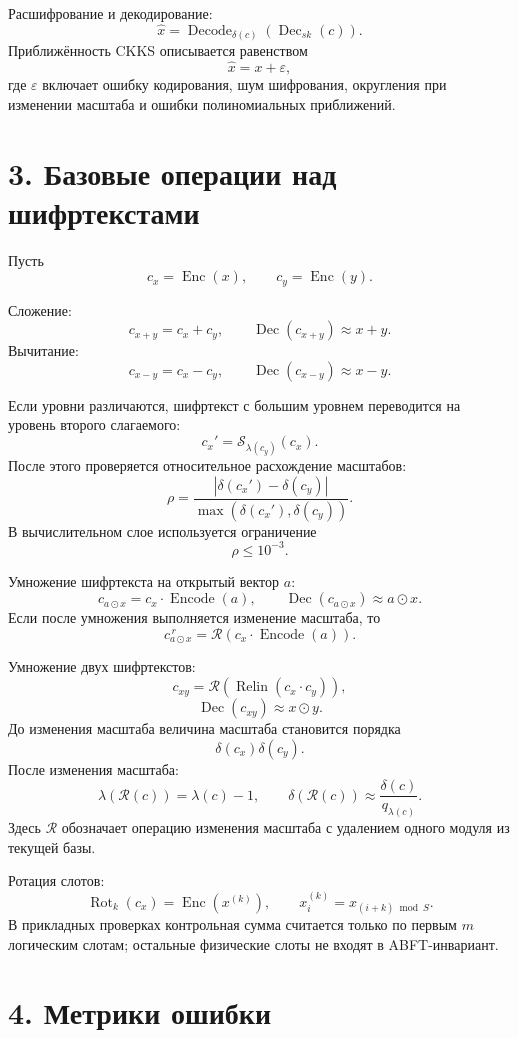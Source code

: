 \documentclass[12pt]{article}
\newcommand{\Enc}{\operatorname{Enc}}
\newcommand{\Dec}{\operatorname{Dec}}
\newcommand{\Encode}{\operatorname{Encode}}
\newcommand{\Decode}{\operatorname{Decode}}
\newcommand{\Resc}{\mathcal{R}}
\newcommand{\Relin}{\operatorname{Relin}}
\newcommand{\Rot}{\operatorname{Rot}}
\newcommand{\Switch}{\mathcal{S}}
\newcommand{\lvl}{\lambda}
\newcommand{\scl}{\delta}
\begin{document}
Расшифрование и декодирование:
\[
    \hat{x}=
    \Decode_{\scl(c)}
    \left(
        \Dec_{sk}(c)
    \right).
\]
Приближённость CKKS описывается равенством
\[
    \hat{x}=x+\varepsilon,
\]
где \(\varepsilon\) включает ошибку кодирования, шум шифрования, округления
при изменении масштаба и ошибки полиномиальных приближений.

\section*{3. Базовые операции над шифртекстами}

Пусть
\[
    c_x=\Enc(x),\qquad c_y=\Enc(y).
\]

Сложение:
\[
    c_{x+y}=c_x+c_y,
    \qquad
    \Dec(c_{x+y})\approx x+y.
\]
Вычитание:
\[
    c_{x-y}=c_x-c_y,
    \qquad
    \Dec(c_{x-y})\approx x-y.
\]

Если уровни различаются, шифртекст с большим уровнем переводится на уровень
второго слагаемого:
\[
    c_x'=\Switch_{\lvl(c_y)}(c_x).
\]
После этого проверяется относительное расхождение масштабов:
\[
    \rho=
    \frac{|\scl(c_x')-\scl(c_y)|}
    {\max(\scl(c_x'),\scl(c_y))}.
\]
В вычислительном слое используется ограничение
\[
    \rho\leq 10^{-3}.
\]

Умножение шифртекста на открытый вектор \(a\):
\[
    c_{a\odot x}=c_x\cdot\Encode(a),
    \qquad
    \Dec(c_{a\odot x})\approx a\odot x.
\]
Если после умножения выполняется изменение масштаба, то
\[
    c_{a\odot x}^{\,r}
    =
    \Resc(c_x\cdot\Encode(a)).
\]

Умножение двух шифртекстов:
\[
    c_{xy}
    =
    \Resc
    \left(
        \Relin(c_x\cdot c_y)
    \right),
\]
\[
    \Dec(c_{xy})\approx x\odot y.
\]
До изменения масштаба величина масштаба становится порядка
\[
    \scl(c_x)\scl(c_y).
\]
После изменения масштаба:
\[
    \lvl(\Resc(c))=\lvl(c)-1,
    \qquad
    \scl(\Resc(c))\approx\frac{\scl(c)}{q_{\lvl(c)}}.
\]
Здесь \(\mathcal{R}\) обозначает операцию изменения масштаба с удалением
одного модуля из текущей базы.

Ротация слотов:
\[
    \Rot_k(c_x)=\Enc(x^{(k)}),
    \qquad
    x^{(k)}_i=x_{(i+k)\bmod S}.
\]
В прикладных проверках контрольная сумма считается только по первым \(m\)
логическим слотам; остальные физические слоты не входят в ABFT-инвариант.

\section*{4. Метрики ошибки}
\end{document}
